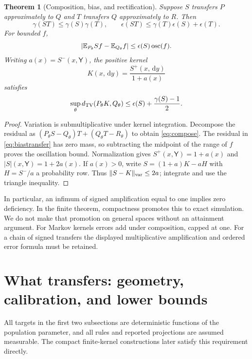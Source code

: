 \documentclass[11pt]{article}
\numberwithin{equation}{section}
\newtheorem{theorem}{Theorem}[section]
\theoremstyle{definition}
\theoremstyle{remark}
\newcommand{\E}{\mathbb E}\newcommand{\Pp}{\mathbb P}\newcommand{\R}{\mathbb R}\newcommand{\N}{\mathbb N}
\newcommand{\dd}{\,\mathrm d}\newcommand{\norm}[1]{\left\lVert#1\right\rVert}\newcommand{\Scal}{\mathsf S}\newcommand{\Tcal}{\mathsf T}
\begin{document}
\begin{theorem}[Composition, bias, and rectification]\label{thm:composition}
Suppose $S$ transfers $P$ approximately to $Q$ and $T$ transfers $Q$ approximately to $R$. Then
\begin{equation}\label{eq:compose}
 \gamma(ST)\le\gamma(S)\gamma(T),\qquad
 \epsilon(ST)\le\gamma(T)\epsilon(S)+\epsilon(T).
\end{equation}
For bounded $f$,
\begin{equation}\label{eq:biastransfer}
 |\E_{P_\theta}Sf-\E_{Q_\theta}f|\le\epsilon(S)\osc(f).
\end{equation}
Writing $a(x)=S^-(x,\mathsf Y)$, the positive kernel
\[
 K(x,\dd y)=\frac{S^+(x,\dd y)}{1+a(x)}
\]
satisfies
\begin{equation}\label{eq:rectify}
 \sup_\theta d_{\rm TV}(P_\theta K,Q_\theta)
 \le\epsilon(S)+\frac{\gamma(S)-1}{2}.
\end{equation}
\end{theorem}
\begin{proof}
Variation is submultiplicative under kernel integration. Decompose the residual as $(P_\theta S-Q_\theta)T+(Q_\theta T-R_\theta)$ to obtain \eqref{eq:compose}. The residual in \eqref{eq:biastransfer} has zero mass, so subtracting the midpoint of the range of $f$ proves the oscillation bound. Normalization gives $S^+(x,\mathsf Y)=1+a(x)$ and $|S|(x,\mathsf Y)=1+2a(x)$. If $a(x)>0$, write $S=(1+a)K-aH$ with $H=S^-/a$ a probability row. Thus $\|S-K\|_{\rm var}\le2a$; integrate and use the triangle inequality.
\end{proof}
In particular, an infimum of signed amplification equal to one implies zero deficiency. In the finite theorem, compactness promotes this to exact simulation. We do not make that promotion on general spaces without an attainment argument. For Markov kernels errors add under composition, capped at one. For a chain of signed transfers the displayed multiplicative amplification and ordered error formula must be retained.

\section{What transfers: geometry, calibration, and lower bounds}\label{sec:guarantees}
All targets in the first two subsections are deterministic functions of the population parameter, and all rules and reported projections are assumed measurable. The compact finite-kernel constructions later satisfy this requirement directly.
\end{document}
